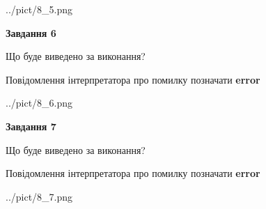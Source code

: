 \documentclass[10pt, ukrainian]{article}
\begin{document}
{\begin {large}
\begin{center}
	{../pict/8_5.png}
\end{center}
\newpage

{\begin {center}\textbf{Завдання 6}\end {center}}\par
Що буде виведено за виконання? \par
Повідомлення інтерпретатора про помилку позначати \textbf{error}

\begin{center}
	{../pict/8_6.png}
\end{center}
\newpage

{\begin {center}\textbf{Завдання 7}\end {center}}\par
Що буде виведено за виконання? \par
Повідомлення інтерпретатора про помилку позначати \textbf{error}

\begin{center}
	{../pict/8_7.png}
\end{center}
\newpage

\end {large}}
\end{document}
